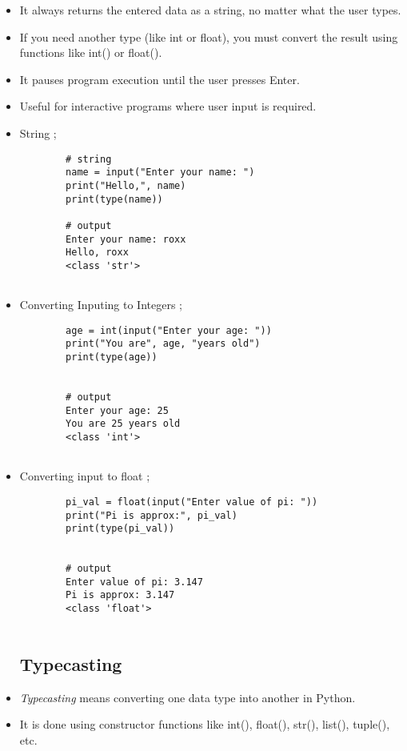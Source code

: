 \documentclass[a4paper,11pt]{article}
\theoremstyle{mytheor}
\begin{document}
\begin{itemize}
	\item It always returns the entered data as a string, no matter what the user types.
	
	\item If you need another type (like int or float), you must convert the result using functions like int() or float().
	
	\item It pauses program execution until the user presses Enter.
	
	\item Useful for interactive programs where user input is required.
	
	\item String ;
	\begin{lstlisting}
		# string 
		name = input("Enter your name: ")
		print("Hello,", name)
		print(type(name))
		
		# output
		Enter your name: roxx
		Hello, roxx
		<class 'str'>
		
	\end{lstlisting}
	
	\item Converting Inputing to Integers ;
	\begin{lstlisting}
		age = int(input("Enter your age: "))
		print("You are", age, "years old")
		print(type(age))
		
		
		# output
		Enter your age: 25
		You are 25 years old
		<class 'int'>
		
	\end{lstlisting}
	
	\item Converting input to float ;
	\begin{lstlisting}
		pi_val = float(input("Enter value of pi: "))
		print("Pi is approx:", pi_val)
		print(type(pi_val))
		
		
		# output 
		Enter value of pi: 3.147
		Pi is approx: 3.147
		<class 'float'>
		
	\end{lstlisting}
	
	\subsection{Typecasting}
	\item \textit{Typecasting} means converting one data type into another in Python.
	
	\item It is done using constructor functions like int(), float(), str(), list(), tuple(), etc.
	

\end{itemize}
\end{document}
